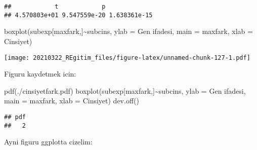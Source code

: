 \documentclass[
]{book}
\newenvironment{Shaded}{\begin{snugshade}}{\end{snugshade}}
\newcommand{\AttributeTok}[1]{\textcolor[rgb]{0.77,0.63,0.00}{#1}}
\newcommand{\FunctionTok}[1]{\textcolor[rgb]{0.00,0.00,0.00}{#1}}
\newcommand{\NormalTok}[1]{#1}
\newcommand{\SpecialCharTok}[1]{\textcolor[rgb]{0.00,0.00,0.00}{#1}}
\newcommand{\StringTok}[1]{\textcolor[rgb]{0.31,0.60,0.02}{#1}}
\begin{document}
\begin{verbatim}
##            t            p              
## 4.570803e+01 9.547559e-20 1.638361e-15
\end{verbatim}

\begin{Shaded}
\begin{Highlighting}[]
\FunctionTok{boxplot}\NormalTok{(subexp[maxfark,]}\SpecialCharTok{\textasciitilde{}}\NormalTok{subcins, }\AttributeTok{ylab =} \StringTok{\textquotesingle{}Gen ifadesi\textquotesingle{}}\NormalTok{, }\AttributeTok{main =}\NormalTok{ maxfark, }
        \AttributeTok{xlab =} \StringTok{\textquotesingle{}Cinsiyet\textquotesingle{}}\NormalTok{)}
\end{Highlighting}
\end{Shaded}

\texttt{[image: 20210322\_REgitim\_files/figure-latex/unnamed-chunk-127-1.pdf]}

Figuru kaydetmek icin:

\begin{Shaded}
\begin{Highlighting}[]
\FunctionTok{pdf}\NormalTok{(}\StringTok{\textquotesingle{}./cinsiyetfark.pdf\textquotesingle{}}\NormalTok{)}
\FunctionTok{boxplot}\NormalTok{(subexp[maxfark,]}\SpecialCharTok{\textasciitilde{}}\NormalTok{subcins, }\AttributeTok{ylab =} \StringTok{\textquotesingle{}Gen ifadesi\textquotesingle{}}\NormalTok{, }\AttributeTok{main =}\NormalTok{ maxfark, }
        \AttributeTok{xlab =} \StringTok{\textquotesingle{}Cinsiyet\textquotesingle{}}\NormalTok{)}
\FunctionTok{dev.off}\NormalTok{()}
\end{Highlighting}
\end{Shaded}

\begin{verbatim}
## pdf 
##   2
\end{verbatim}

Ayni figuru ggplotta cizelim:
\end{document}
